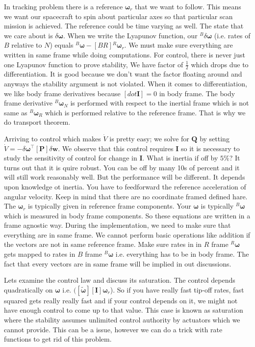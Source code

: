 \documentclass{article}
\begin{document}
In tracking problem there is a reference $\bm{\omega}_{r}$ that we want to follow. This means we want our spacecraft to spin about particular axes so that particular scan mission is achieved. The reference could be time varying as well. The state that we care about is $\delta\bm{\omega}$. When we write the Lyapunov function, our ${}^{B}\delta\bm{\omega}$ (i.e. rates of $B$ relative to $N$) equals ${}^{B}\bm{\omega}-[BR]{}^{R}\bm{\omega}_{r}$. We must make sure everything are written in same frame while doing computations. For control, there is never just one Lyapunov function to prove stability, We have factor of $\frac{1}{2}$ which drops due to differentiation. It is good because we don't want the factor floating around and anyways the stability argument is not violated. When it comes to differentiation, we like body frame derivatives because $[dot{\bm{I}}]=0$ in body frame. The body frame derivative ${}^{B}\bm{\omega}_{N}$ is performed with respect to the inertial frame which is not same as ${}^{B}\bm{\omega}_{R}$ which is performed relative to the reference frame. That is why we do transport theorem.

Arriving to control which makes $\dot{V}$ is pretty easy; we solve for $\bm{Q}$ by setting $\dot{V}=-\delta\bm{\omega}^{\intercal}[\bm{P}]\delta\bm{w}$. We observe that this control requires $\bm{I}$ so it is necessary to study the sensitivity of control for change in $\bm{I}$. What is inertia if off by $5\%$? It turns out that it is quire robust. You can be off by many 10s of percent and it will still work reasonably well. But the performance will be different. It depends upon knowledge ot inertia. You have to feedforward the reference acceleration of angular velocity. Keep in mind that there are no coordinate framed defined hare. The $\bm{\omega}_{r}$ is typically given in reference frame components. Your $\bm{\omega}$ is typically ${}^{B}\bm{\omega}$ which is measured in body frame components. So these equations are written in a frame agnostic way. During the implementation, we need to make sure that everything are in same frame. We cannot perform basic operations like addition if the vectors are not in same reference frame. Make sure rates in in $R$ frame ${}^{R}\bm{\omega}$ gets mapped to rates in $B$ frame ${}^{B}\bm{\omega}$ i.e. everything has to be in body frame. The fact that every vectors are in same frame will be implied in out discussions.

Lets examine the control law and discuss its saturation. The control depends quadratically on $\bm{\omega}$ i.e. $([\tilde{\bm{\omega}}][\bm{I}]\bm{\omega}_{r}$). So if you have really fast tip-off rates, fast squared gets really really fast and if your control depends on it, we might not have enough control to come up to that value. This case is known as saturation where the stability assumes unlimited control authority by actuators which we cannot provide. This can be a issue, however we can do a trick with rate functions to get rid of this problem.
\end{document}
